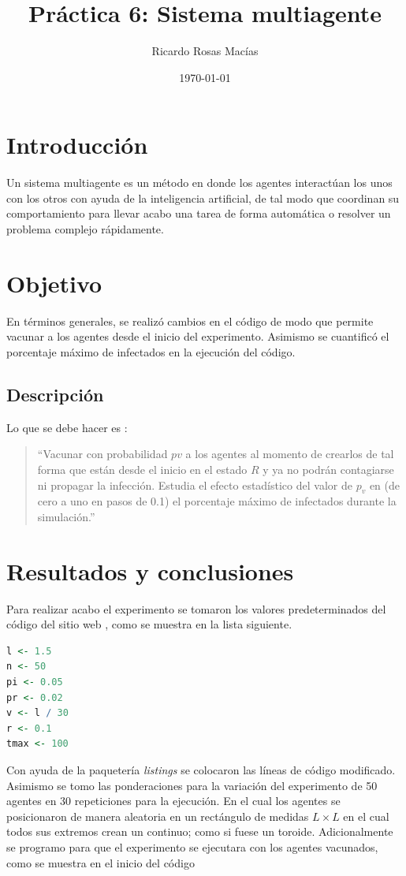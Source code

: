 \documentclass[12pt, letterpaper] {article}
\author{Ricardo Rosas Macías}
\title{Práctica 6: Sistema multiagente}
\date{\today}
\begin{document}
\maketitle


\section{Introducción}
Un sistema multiagente es un método en donde los agentes interactúan los unos con los otros con ayuda de la inteligencia artificial, de tal modo que coordinan su comportamiento para llevar acabo una tarea de forma automática o resolver un problema complejo rápidamente.

 \section{Objetivo}
En términos generales,  se realizó cambios en el código de modo que permite vacunar a los agentes desde el inicio del experimento. Asimismo se cuantificó el porcentaje máximo de infectados en la ejecución del código.
 
 \subsection{Descripción}
 
Lo que se debe hacer es \cite{elisawebSMA}:
\begin{quotation}
 ``Vacunar con probabilidad $pv$ a los agentes al momento de crearlos de tal forma que están desde el inicio en el estado $R$ y ya no podrán contagiarse ni propagar la infección. Estudia el efecto estadístico del valor de $p_v$ en (de cero a uno en pasos de 0.1) el porcentaje máximo de infectados durante la simulación.''
\end{quotation}

\section{Resultados y conclusiones}

Para realizar acabo el experimento se tomaron los valores predeterminados del código del sitio web \cite{elisawebSMA}, como se muestra en la lista siguiente. 

\begin{lstlisting}[language=R]
l <- 1.5     
n <- 50      
pi <- 0.05 
pr <- 0.02 
v <- l / 30
r <- 0.1 
tmax <- 100 
\end{lstlisting}

Con ayuda de la paquetería \textit{listings} se colocaron las líneas de código modificado\cite{EMP6}. Asimismo se tomo las ponderaciones para la variación del experimento de 50 agentes en 30 repeticiones para la ejecución. En el cual los agentes se posicionaron de manera aleatoria en un rectángulo de medidas $L \times L$ en el cual todos sus extremos crean un continuo; como si fuese un toroide. Adicionalmente se programo para que el experimento se ejecutara con los agentes vacunados,  como se muestra en el inicio del código
\end{document}
